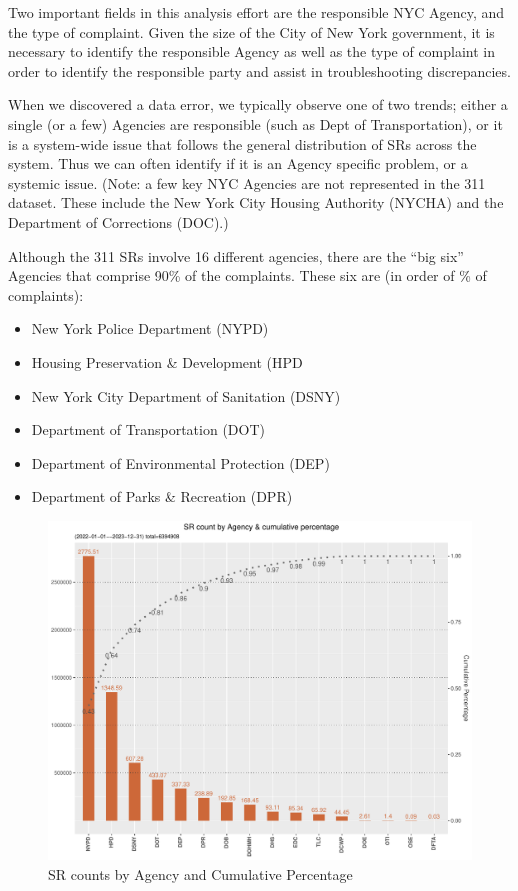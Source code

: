 \documentclass[12pt, titlepage]{article}
\begin{document}
\FloatBarrier %

Two important fields in this analysis effort are the responsible NYC Agency, and the type of complaint.
Given the size of the City of New York government, it is necessary to identify the responsible Agency as well as the type of complaint in order to 
identify the responsible party and assist in troubleshooting discrepancies.

When we discovered a data error, we typically observe one of two trends; either a single (or a few) Agencies are responsible (such as Dept of Transportation), 
or it is a system-wide issue that follows the general distribution of  SRs across the system. 
Thus we can often identify if it is an Agency specific problem, or a systemic issue.  (Note: a few key NYC Agencies are not 
represented in the 311 dataset. These include the New York City Housing Authority (NYCHA) and the
Department of Corrections (DOC).)

Although the 311 SRs involve 16 different agencies, there are the ``big six'' Agencies that comprise
90\% of the complaints. These six are (in order of \% of complaints):  

\begin{itemize}
	\item New York Police Department (NYPD)
	\item Housing Preservation \& Development (HPD
	\item New York City Department of Sanitation (DSNY)
	\item Department of Transportation (DOT)
	\item Department of Environmental Protection (DEP)
	\item Department of Parks \& Recreation (DPR)
\end{itemize}

\begin{figure}[H]
  \centering
	  \includegraphics[width=\textwidth]{SRs_by_Agency.pdf}
	  \caption{SR counts by Agency and Cumulative Percentage}
	  
\end{figure}
\end{document}
